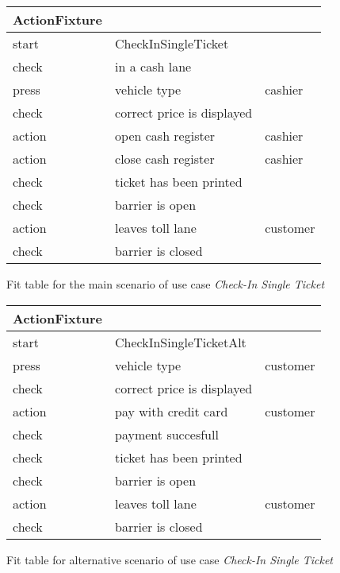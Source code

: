
\begin{figure}
\centering
\begin{tabular}{|l|l|l|}
\hline 
ActionFixture &  & \tabularnewline
\hline 
start & CheckInSingleTicket & \tabularnewline
\hline 
check & in a cash lane & \tabularnewline
\hline 
press & vehicle type & cashier\tabularnewline
\hline 
check & correct price is displayed & \tabularnewline
\hline 
action & open cash register & cashier\tabularnewline
\hline 
action & close cash register & cashier\tabularnewline
\hline 
check & ticket has been printed & \tabularnewline
\hline 
check & barrier is open & \tabularnewline
\hline 
action & leaves toll lane & customer\tabularnewline
\hline 
check & barrier is closed & \tabularnewline
\hline 
\end{tabular}
\caption{Fit table for the main scenario of use case \emph{Check-In Single Ticket}}
\end{figure}

\begin{figure}
\centering
\begin{tabular}{|l|l|l|}
\hline 
ActionFixture &  & \tabularnewline
\hline 
start & CheckInSingleTicketAlt & \tabularnewline
\hline 
press & vehicle type & customer\tabularnewline
\hline 
check & correct price is displayed & \tabularnewline
\hline 
action & pay with credit card & customer\tabularnewline
\hline 
check & payment succesfull & \tabularnewline
\hline 
check & ticket has been printed & \tabularnewline
\hline 
check & barrier is open & \tabularnewline
\hline 
action & leaves toll lane & customer\tabularnewline
\hline 
check & barrier is closed & \tabularnewline
\hline 
\end{tabular}
\caption{Fit table for alternative scenario of use case \emph{Check-In Single Ticket}}
\end{figure}

